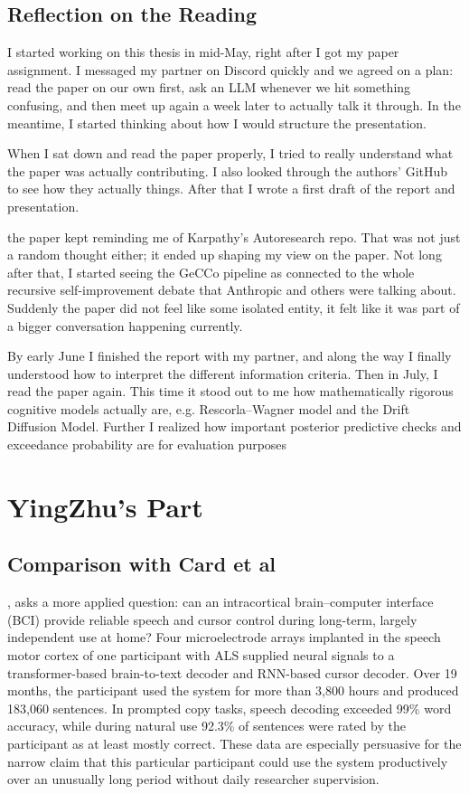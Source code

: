 \subsection{Reflection on the Reading}

I started working on this thesis in mid-May, right after I got my paper assignment. I messaged my partner on Discord quickly and we agreed on a plan: read the paper on our own first, ask an LLM whenever we hit something confusing, and then meet up again a week later to actually talk it through. In the meantime, I started thinking about how I would structure the presentation.
 
When I sat down and read the paper properly, I tried to really understand what the paper was actually contributing. I also looked through the authors' GitHub to see how they actually  things. After that I wrote a first draft of the report and presentation.
 
the paper kept reminding me of Karpathy's Autoresearch repo. That was not just a random thought either; it ended up shaping my view on the paper. Not long after that, I started seeing the GeCCo pipeline as connected to the whole recursive self-improvement debate that Anthropic and others were talking about. Suddenly the paper did not feel like some isolated entity, it felt like it was part of a bigger conversation happening currently.
 
By early June I finished the report with my partner, and along the way I finally understood how to interpret the different information criteria. Then in July, I read the paper again. This time it stood out to me how mathematically rigorous  cognitive models actually are, e.g. Rescorla--Wagner model and the Drift Diffusion Model. Further I realized how important posterior predictive checks and exceedance probability are for evaluation purposes

\section{YingZhu's Part}
\subsection{Comparison with Card et al}
\citet{card2025longterm}, asks a more applied question: can an intracortical brain--computer interface (BCI) provide reliable speech and cursor control during long-term, largely independent use at home? Four microelectrode arrays implanted in the speech motor cortex of one participant with ALS supplied neural signals to a transformer-based brain-to-text decoder and RNN-based cursor decoder. Over 19 months, the participant used the system for more than 3,800 hours and produced 183,060 sentences. In prompted copy tasks, speech decoding exceeded 99\% word accuracy, while during natural use 92.3\% of sentences were rated by the participant as at least mostly correct. These data are especially persuasive for the narrow claim that this particular participant could use the system productively over an unusually long period without daily researcher supervision.

